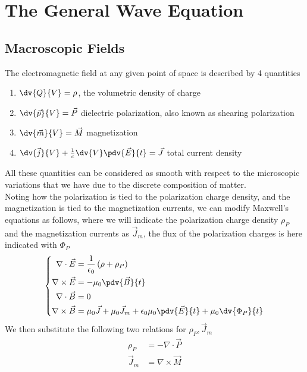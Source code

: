 \documentclass[../electromagnetism.tex]{subfiles}
\begin{document}
\section{The General Wave Equation}
\subsection{Macroscopic Fields}
The electromagnetic field at any given point of space is described by 4 quantities
\begin{enumerate}
\item $\dv{Q}{V}=\rho$, the volumetric density of charge
\item $\dv{\vec{p}}{V}=\vec{P}$ dielectric polarization, also known as shearing polarization
\item $\dv{\vec{m}}{V}=\vec{M}$ magnetization
\item $\dv{\vec{j}}{V}+\frac{1}{c}\dv{V}\pdv{\vec{E}}{t}=\vec{J}$ total current density
\end{enumerate}
All these quantities can be considered as smooth with respect to the microscopic variations that we have due to the discrete composition of matter.\\
Noting how the polarization is tied to the polarization charge density, and the magnetization is tied to the magnetization currents, we can modify Maxwell's equations as follows, where we will indicate the polarization charge density $\rho_P$ and the magnetization currents as $\vec{J}_m$, the flux of the polarization charges is here indicated with $\Phi_P$
\begin{equation}
	\left\{\begin{aligned}
	\nabla\cdot\vec{E}&= \frac{1}{\epsilon_0}\left( \rho+\rho_P \right)\\
	\nabla\times\vec{E}&= -\mu_0\pdv{\vec{B}}{t}\\
	\nabla\cdot\vec{B}&= 0\\
	\nabla\times\vec{B}&= \mu_0\vec{J}+\mu_0\vec{J}_m+\epsilon_0\mu_0\pdv{\vec{E}}{t}+\mu_0\dv{\Phi_P}{t}
	\end{aligned}\right.
	\label{eq:mwgeneral.sol}
\end{equation}
We then substitute the following two relations for $\rho_P, \vec{J}_m$
\begin{equation}
	\begin{aligned}
		\rho_P&= -\nabla\cdot\vec{P}\\
		\vec{J}_m&= \nabla\times\vec{M}
	\end{aligned}
	\label{eq:polmagrel.sol}
\end{equation}
\end{document}
